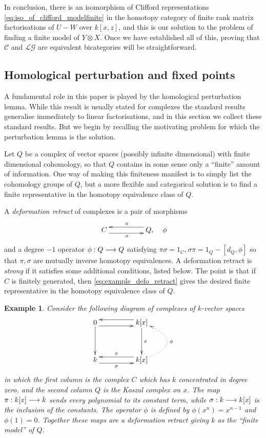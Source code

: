 \documentclass[english,letter paper,12pt,leqno]{article}
\theoremstyle{example}
\newtheorem{example}[theorem]{Example}
\numberwithin{equation}{section}
\def\LG{\mathcal{LG}}
\def\L{\mathcal{C}}
\begin{document}
In conclusion, there is an isomorphism of Clifford representations \eqref{eq:iso_of_clifford_modelfinite} in the homotopy category of finite rank matrix factorisations of $U - W$ over $k[x,z]$, and this is our solution to the problem of finding a finite model of $Y \otimes X$. Once we have established all of this, proving that $\L$ and $\LG$ are equivalent bicategories will be straightforward.

\subsection{Homological perturbation and fixed points}\label{section:homolog_fix}

A fundamental role in this paper is played by the homological perturbation lemma. While this result is usually stated for complexes the standard results generalise immediately to linear factorisations, and in this section we collect these standard results. But we begin by recalling the motivating problem for which the perturbation lemma is the solution.

Let $Q$ be a complex of vector spaces (possibly infinite dimensional) with finite dimensional cohomology, so that $Q$ contains in some sense only a ``finite'' amount of information. One way of making this finiteness manifest is to simply list the cohomology groups of $Q$, but a more flexible and categorical solution is to find a finite representative in the homotopy equivalence class of $Q$.

A \emph{deformation retract} of complexes is a pair of morphisms
\begin{equation}\label{eq:example_defo_retract}
\xymatrix@C+2pc{
C \ar@<-1ex>[r]_\sigma & Q, \ar@<-1ex>[l]_\pi
} \quad \phi
\end{equation}
and a degree $-1$ operator $\phi: Q \longrightarrow Q$ satisfying $\pi \sigma = 1_C, \sigma \pi = 1_Q - [d_Q, \phi]$ so that $\pi, \sigma$ are mutually inverse homotopy equivalences. A deformation retract is \emph{strong} if it satisfies some additional conditions, listed below. The point is that if $C$ is finitely generated, then \eqref{eq:example_defo_retract} gives the desired finite representative in the homotopy equivalence class of $Q$. 

\begin{example}\label{example:koszulsplit} Consider the following diagram of complexes of $k$-vector spaces
\[
\xymatrix@C+2pc@R+1pc{
0 \ar[d] \ar@<-1ex>[r] & k[x] \ar@<-1ex>[l] \ar[d]^-{x}\\
k \ar@<-1ex>[r]_-{\sigma} & k[x] \ar@<-1ex>[l]_-{\pi} \ar@/_3pc/@{.>}[u]_-{\phi}
}
\]
in which the first column is the complex $C$ which has $k$ concentrated in degree zero, and the second column $Q$ is the Koszul complex on $x$. The map $\pi: k[x] \longrightarrow k$ sends every polynomial to its constant term, while $\sigma: k \longrightarrow k[x]$ is the inclusion of the constants. The operator $\phi$ is defined by $\phi( x^n ) = x^{n-1}$ and $\phi(1) = 0$. Together these maps are a deformation retract giving $k$ as the ``finite model'' of $Q$.
\end{example}
\end{document}
